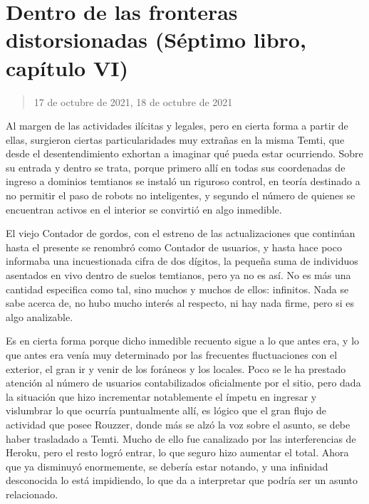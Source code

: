 \documentclass[
]{book}
\begin{document}
\hypertarget{dentro-de-las-fronteras-distorsionadas-suxe9ptimo-libro-capuxedtulo-vi}{%
\section{Dentro de las fronteras distorsionadas (Séptimo libro, capítulo VI)}\label{dentro-de-las-fronteras-distorsionadas-suxe9ptimo-libro-capuxedtulo-vi}}

\begin{quote}
17 de octubre de 2021, 18 de octubre de 2021
\end{quote}

Al margen de las actividades ilícitas y legales, pero en cierta forma a partir de ellas, surgieron ciertas particularidades muy extrañas en la misma Temti, que desde el desentendimiento exhortan a imaginar qué pueda estar ocurriendo. Sobre su entrada y dentro se trata, porque primero allí en todas sus coordenadas de ingreso a dominios temtianos se instaló un riguroso control, en teoría destinado a no permitir el paso de robots no inteligentes, y segundo el número de quienes se encuentran activos en el interior se convirtió en algo inmedible.

El viejo Contador de gordos, con el estreno de las actualizaciones que continúan hasta el presente se renombró como Contador de usuarios, y hasta hace poco informaba una incuestionada cifra de dos dígitos, la pequeña suma de individuos asentados en vivo dentro de suelos temtianos, pero ya no es así. No es más una cantidad especifica como tal, sino muchos y muchos de ellos: infinitos. Nada se sabe acerca de, no hubo mucho interés al respecto, ni hay nada firme, pero si es algo analizable.

Es en cierta forma porque dicho inmedible recuento sigue a lo que antes era, y lo que antes era venía muy determinado por las frecuentes fluctuaciones con el exterior, el gran ir y venir de los foráneos y los locales. Poco se le ha prestado atención al número de usuarios contabilizados oficialmente por el sitio, pero dada la situación que hizo incrementar notablemente el ímpetu en ingresar y vislumbrar lo que ocurría puntualmente allí, es lógico que el gran flujo de actividad que posee Rouzzer, donde más se alzó la voz sobre el asunto, se debe haber trasladado a Temti. Mucho de ello fue canalizado por las interferencias de Heroku, pero el resto logró entrar, lo que seguro hizo aumentar el total. Ahora que ya disminuyó enormemente, se debería estar notando, y una infinidad desconocida lo está impidiendo, lo que da a interpretar que podría ser un asunto relacionado.
\end{document}
